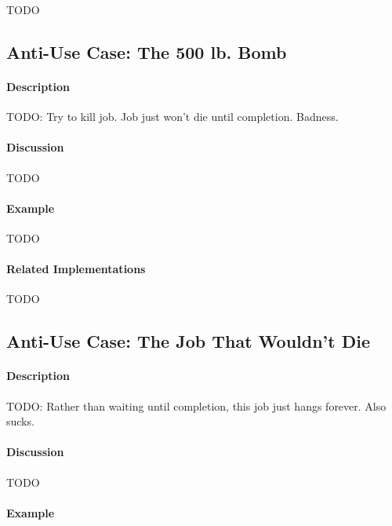 {\Large TODO}

\subsection{Anti-Use Case: The 500 lb. Bomb}

\paragraph{Description}

{\Large TODO:} Try to kill job.  Job just won't die until completion.  Badness.

\paragraph{Discussion}

{\Large TODO}

\paragraph{Example}

{\Large TODO}

\paragraph{Related Implementations}

{\Large TODO}

\subsection{Anti-Use Case: The Job That Wouldn't Die}

\paragraph{Description}

{\Large TODO:} Rather than waiting until completion, this job just hangs forever.  Also sucks.

\paragraph{Discussion}

{\Large TODO}

\paragraph{Example}

